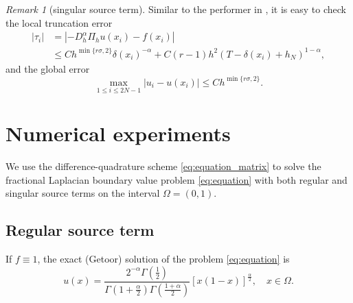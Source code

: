 \documentclass{amsart}
\theoremstyle{definition}
\theoremstyle{remark}
\newtheorem{remark}[theorem]{Remark}
\numberwithin{equation}{section}
\begin{document}
\begin{remark}[singular source term]
  Similar to the performer in ,
  it is easy to check the local truncation error
    \begin{equation*} 
      \begin{aligned}
        |\tau_i| &= | -D_h^{\alpha} \Pi_hu(x_i) - f(x_i) | \\
        &\le  C  h^{\min\{r\sigma, 2\}} \delta(x_i)^{-\alpha}
        + C(r-1) h^2 (T-\delta(x_{i}) + h_N)^{1-\alpha},
      \end{aligned}
    \end{equation*}
  and the global error
    \begin{equation*} 
      \max_{1\le i \le 2N-1} |u_i - u(x_i)| \le C h^{\min\{r\sigma, 2\}}.
    \end{equation*}
\end{remark}



\section{Numerical experiments}
\label{sec:experiments}

We use the difference-quadrature scheme \eqref{eq:equation_matrix} to solve the fractional Laplacian boundary value problem \eqref{eq:equation} with both regular and singular source terms on the interval \(\Omega = (0, 1)\).

\subsection{Regular source term}

If \(f\equiv 1\), the exact (Getoor) solution \cite{Getoor1961,HuangO:14,RosOtonSerra:14} of the problem \eqref{eq:equation} is
\begin{equation*}
    u(x) = \frac{2^{-\alpha} \Gamma(\frac{1}{2})}{\Gamma(1+\frac{\alpha}{2})\Gamma(\frac{1+\alpha}{2}) } \left[ x(1-x) \right]^{\frac{\alpha}{2}}, \quad x\in \Omega.
\end{equation*}
\end{document}
